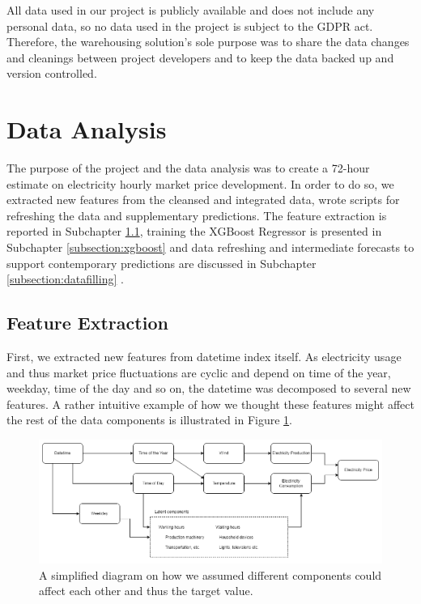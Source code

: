 \documentclass{article}
\begin{document}
All data used in our project is publicly available and does not include any personal data, so no data used in the project is subject to the GDPR act. Therefore, the warehousing solution's sole purpose was to share the data changes and cleanings between project developers and to keep the data backed up and version controlled.

\section{Data Analysis}
\label{section:analysis}

The purpose of the project and the data analysis was to create a 72-hour estimate on electricity hourly market price development. In order to do so, we extracted new features from the cleansed and integrated data, wrote scripts for refreshing the data and supplementary predictions. The feature extraction is reported in Subchapter \ref{subsection:extraction}, training the XGBoost Regressor is presented in Subchapter \ref{subsection:xgboost} and data refreshing and intermediate forecasts to support contemporary predictions are discussed in Subchapter \ref{subsection:datafilling} .

\subsection{Feature Extraction}
\label{subsection:extraction}

First, we extracted new features from datetime index itself. As electricity usage and thus market price fluctuations are cyclic and depend on time of the year, weekday, time of the day and so on, the datetime was decomposed to several new features. A rather intuitive example of how we thought these features might affect the rest of the data components is illustrated in Figure \ref{fig:components}.

\begin{figure}[ht] 
\centering
\includegraphics[width=\textwidth]{report/images/components.png}
\caption{A simplified diagram on how we assumed different components could affect each other and thus the target value.}
\label{fig:components} 
\end{figure}
\end{document}
